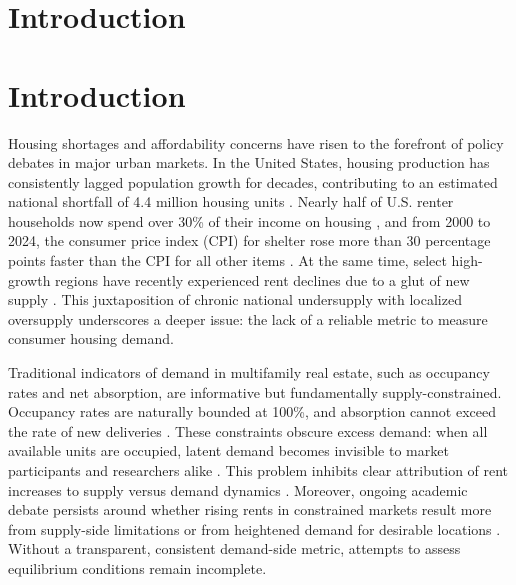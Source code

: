 \documentclass[sn-mathphys-num]{sn-jnl}%
\theoremstyle{thmstyleone}%
\theoremstyle{thmstyletwo}%
\theoremstyle{thmstylethree}%
\begin{document}
\section{Introduction}\label{sec1}


\section{Introduction}

Housing shortages and affordability concerns have risen to the forefront of policy debates in major urban markets. In the United States, housing production has consistently lagged population growth for decades, contributing to an estimated national shortfall of 4.4 million housing units \citep{betancourt2022us}. Nearly half of U.S. renter households now spend over 30\% of their income on housing \citep{censusNearlyHalf}, and from 2000 to 2024, the consumer price index (CPI) for shelter rose more than 30 percentage points faster than the CPI for all other items \citep{stlouisfedConsumerPrice}. At the same time, select high-growth regions have recently experienced rent declines due to a glut of new supply \citep{mott2024ThisRegion}. This juxtaposition of chronic national undersupply with localized oversupply underscores a deeper issue: the lack of a reliable metric to measure consumer housing demand.

Traditional indicators of demand in multifamily real estate, such as occupancy rates and net absorption, are informative but fundamentally supply-constrained. Occupancy rates are naturally bounded at 100\%, and absorption cannot exceed the rate of new deliveries \citep{mueller1999real}. These constraints obscure excess demand: when all available units are occupied, latent demand becomes invisible to market participants and researchers alike \citep{gabriel2001rental, sirmans1991determinants, pyhrr1999real}. This problem inhibits clear attribution of rent increases to supply versus demand dynamics \citep{pennington2021does, molloy2022housing}. Moreover, ongoing academic debate persists around whether rising rents in constrained markets result more from supply-side limitations \citep{saiz2010geographic} or from heightened demand for desirable locations \citep{davidoff2015supply}. Without a transparent, consistent demand-side metric, attempts to assess equilibrium conditions remain incomplete.
\end{document}
